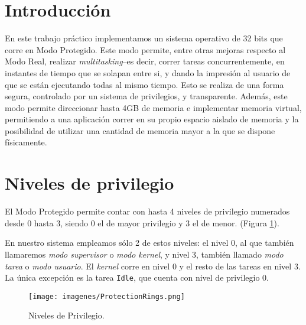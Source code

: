 \documentclass[a4paper]{article}
\begin{document}
\thispagestyle{empty}
 
\maketitle
\newpage

\thispagestyle{empty}
\vfill

\thispagestyle{empty}
\vspace{3cm}
\tableofcontents
\newpage


\newpage


\section{Introducción}
En este trabajo práctico implementamos un sistema operativo de 32 bits que corre en Modo Protegido. Este modo permite, entre otras mejoras respecto al Modo Real, realizar \textit{multitasking}--es decir, correr tareas concurrentemente, en instantes de tiempo que se solapan entre si, y dando la impresión al usuario de que se están ejecutando todas al mismo tiempo. Esto se realiza de una forma segura, controlado por un sistema de privilegios, y transparente. Además, este modo permite direccionar hasta 4GB de memoria e implementar memoria virtual, permitiendo a una aplicación correr en su propio espacio aislado de memoria y la posibilidad de utilizar una cantidad de memoria mayor a la que se dispone físicamente.


\section{Niveles de privilegio}
El Modo Protegido permite contar con hasta 4 niveles de privilegio numerados desde 0 hasta 3, siendo 0 el de mayor privilegio y 3 el de menor. (Figura \ref{PrivL}).

En nuestro sistema empleamos sólo 2 de estos niveles: el nivel 0, al que también llamaremos \textit{modo supervisor} o \textit{modo kernel}, y nivel 3, también llamado \textit{modo tarea} o \textit{modo usuario}. El \textit{kernel} corre en nivel 0 y el resto de las tareas en nivel 3. La única excepción es la tarea \texttt{Idle}, que cuenta con nivel de privilegio 0.
\begin{figure}
  \begin{center}
	\texttt{[image: imagenes/ProtectionRings.png]}
	\caption{Niveles de Privilegio.}
	\label{PrivL}
  \end{center}
\end{figure}
\end{document}
